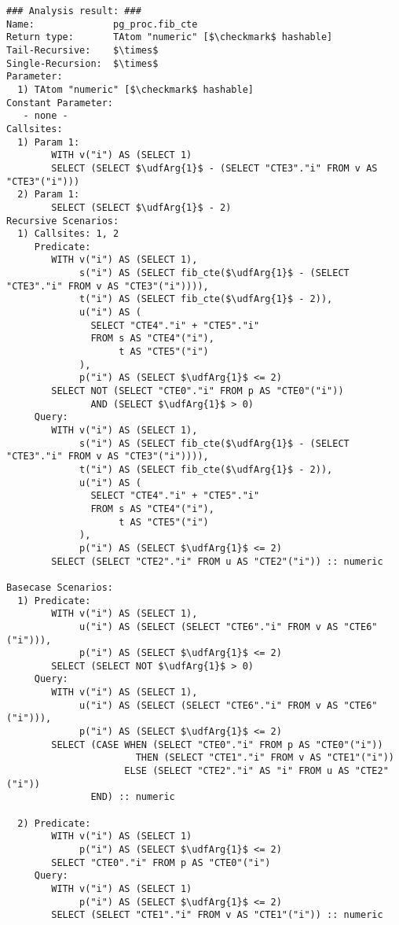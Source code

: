 \begin{lstlisting}[basicstyle=\ttfamily\scriptsize]
### Analysis result: ###
Name:              pg_proc.fib_cte
Return type:       TAtom "numeric" [$\checkmark$ hashable]
Tail-Recursive:    $\times$
Single-Recursion:  $\times$
Parameter:
  1) TAtom "numeric" [$\checkmark$ hashable]
Constant Parameter:
   - none -
Callsites:
  1) Param 1:
        WITH v("i") AS (SELECT 1)
        SELECT (SELECT $\udfArg{1}$ - (SELECT "CTE3"."i" FROM v AS "CTE3"("i"))) 
  2) Param 1:
        SELECT (SELECT $\udfArg{1}$ - 2)
Recursive Scenarios:
  1) Callsites: 1, 2
     Predicate:
        WITH v("i") AS (SELECT 1), 
             s("i") AS (SELECT fib_cte($\udfArg{1}$ - (SELECT "CTE3"."i" FROM v AS "CTE3"("i")))), 
             t("i") AS (SELECT fib_cte($\udfArg{1}$ - 2)), 
             u("i") AS (
               SELECT "CTE4"."i" + "CTE5"."i"                    
               FROM s AS "CTE4"("i"),
                    t AS "CTE5"("i")
             ),
             p("i") AS (SELECT $\udfArg{1}$ <= 2)
        SELECT NOT (SELECT "CTE0"."i" FROM p AS "CTE0"("i"))
               AND (SELECT $\udfArg{1}$ > 0)
     Query:
        WITH v("i") AS (SELECT 1), 
             s("i") AS (SELECT fib_cte($\udfArg{1}$ - (SELECT "CTE3"."i" FROM v AS "CTE3"("i")))), 
             t("i") AS (SELECT fib_cte($\udfArg{1}$ - 2)), 
             u("i") AS (
               SELECT "CTE4"."i" + "CTE5"."i"                    
               FROM s AS "CTE4"("i"),
                    t AS "CTE5"("i")
             ),
             p("i") AS (SELECT $\udfArg{1}$ <= 2)
        SELECT (SELECT "CTE2"."i" FROM u AS "CTE2"("i")) :: numeric 

Basecase Scenarios:
  1) Predicate:
        WITH v("i") AS (SELECT 1), 
             u("i") AS (SELECT (SELECT "CTE6"."i" FROM v AS "CTE6"("i"))), 
             p("i") AS (SELECT $\udfArg{1}$ <= 2)
        SELECT (SELECT NOT $\udfArg{1}$ > 0)
     Query:
        WITH v("i") AS (SELECT 1), 
             u("i") AS (SELECT (SELECT "CTE6"."i" FROM v AS "CTE6"("i"))), 
             p("i") AS (SELECT $\udfArg{1}$ <= 2)
        SELECT (CASE WHEN (SELECT "CTE0"."i" FROM p AS "CTE0"("i"))
                       THEN (SELECT "CTE1"."i" FROM v AS "CTE1"("i"))
                     ELSE (SELECT "CTE2"."i" AS "i" FROM u AS "CTE2"("i"))
               END) :: numeric 

  2) Predicate:
        WITH v("i") AS (SELECT 1)
             p("i") AS (SELECT $\udfArg{1}$ <= 2)
        SELECT "CTE0"."i" FROM p AS "CTE0"("i")
     Query:
        WITH v("i") AS (SELECT 1)
             p("i") AS (SELECT $\udfArg{1}$ <= 2)
        SELECT (SELECT "CTE1"."i" FROM v AS "CTE1"("i")) :: numeric
\end{lstlisting}